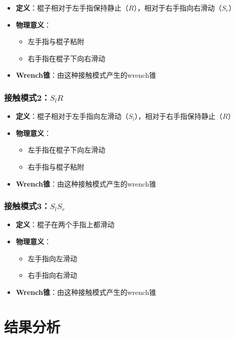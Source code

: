 \documentclass[12pt,a4paper]{article}
\begin{document}
\begin{itemize}
    \item \textbf{定义}：棍子相对于左手指保持静止（$R$），相对于右手指向右滑动（$S_r$）
    \item \textbf{物理意义}：
    \begin{itemize}
        \item 左手指与棍子粘附
        \item 右手指在棍子下向右滑动
    \end{itemize}
    \item \textbf{Wrench锥}：由这种接触模式产生的wrench锥
\end{itemize}

\subsubsection{接触模式2：$S_lR$}

\begin{itemize}
    \item \textbf{定义}：棍子相对于左手指向左滑动（$S_l$），相对于右手指保持静止（$R$）
    \item \textbf{物理意义}：
    \begin{itemize}
        \item 左手指在棍子下向左滑动
        \item 右手指与棍子粘附
    \end{itemize}
    \item \textbf{Wrench锥}：由这种接触模式产生的wrench锥
\end{itemize}

\subsubsection{接触模式3：$S_lS_r$}

\begin{itemize}
    \item \textbf{定义}：棍子在两个手指上都滑动
    \item \textbf{物理意义}：
    \begin{itemize}
        \item 左手指向左滑动
        \item 右手指向右滑动
    \end{itemize}
    \item \textbf{Wrench锥}：由这种接触模式产生的wrench锥
\end{itemize}

\section{结果分析}
\end{document}
